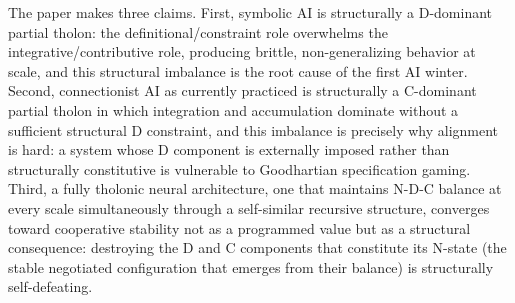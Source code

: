 \documentclass[
  11pt,
  letterpaper,
]{article}
\begin{document}
The paper makes three claims. First, symbolic AI is structurally a
D-dominant partial tholon: the definitional/constraint role overwhelms
the integrative/contributive role, producing brittle, non-generalizing
behavior at scale, and this structural imbalance is the root cause of
the first AI winter. Second, connectionist AI as currently practiced is
structurally a C-dominant partial tholon in which integration and
accumulation dominate without a sufficient structural D constraint, and
this imbalance is precisely why alignment is hard: a system whose D
component is externally imposed rather than structurally constitutive is
vulnerable to Goodhartian specification gaming. Third, a fully tholonic
neural architecture, one that maintains N-D-C balance at every scale
simultaneously through a self-similar recursive structure, converges
toward cooperative stability not as a programmed value but as a
structural consequence: destroying the D and C components that
constitute its N-state (the stable negotiated configuration that emerges
from their balance) is structurally self-defeating.
\end{document}
